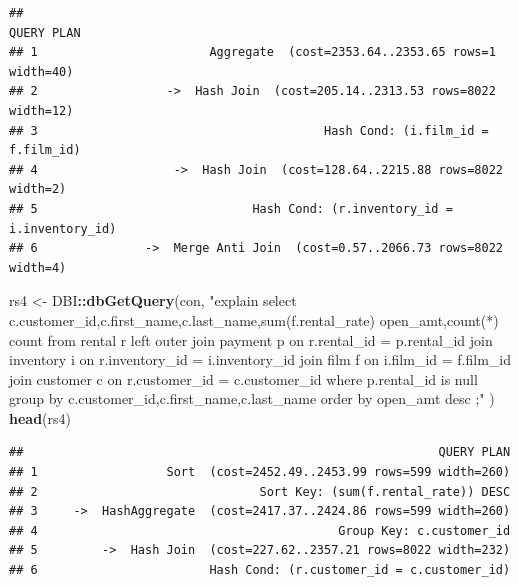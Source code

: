 \documentclass[]{book}
\newenvironment{Shaded}{\begin{snugshade}}{\end{snugshade}}
\newcommand{\KeywordTok}[1]{\textcolor[rgb]{0.13,0.29,0.53}{\textbf{#1}}}
\newcommand{\NormalTok}[1]{#1}
\newcommand{\OperatorTok}[1]{\textcolor[rgb]{0.81,0.36,0.00}{\textbf{#1}}}
\newcommand{\StringTok}[1]{\textcolor[rgb]{0.31,0.60,0.02}{#1}}
\theoremstyle{definition}
\theoremstyle{definition}
\theoremstyle{definition}
\theoremstyle{remark}
\begin{document}
\begin{verbatim}
##                                                                  QUERY PLAN
## 1                        Aggregate  (cost=2353.64..2353.65 rows=1 width=40)
## 2                  ->  Hash Join  (cost=205.14..2313.53 rows=8022 width=12)
## 3                                        Hash Cond: (i.film_id = f.film_id)
## 4                   ->  Hash Join  (cost=128.64..2215.88 rows=8022 width=2)
## 5                              Hash Cond: (r.inventory_id = i.inventory_id)
## 6               ->  Merge Anti Join  (cost=0.57..2066.73 rows=8022 width=4)
\end{verbatim}

\begin{Shaded}
\begin{Highlighting}[]
\NormalTok{rs4 <-}\StringTok{ }\NormalTok{DBI}\OperatorTok{::}\KeywordTok{dbGetQuery}\NormalTok{(con,}
                \StringTok{"explain select c.customer_id,c.first_name,c.last_name,sum(f.rental_rate) open_amt,count(*) count}
\StringTok{                   from rental r }
\StringTok{                        left outer join payment p }
\StringTok{                          on r.rental_id = p.rental_id  }
\StringTok{                        join inventory i}
\StringTok{                          on r.inventory_id = i.inventory_id}
\StringTok{                        join film f}
\StringTok{                          on i.film_id = f.film_id}
\StringTok{                        join customer c}
\StringTok{                          on r.customer_id = c.customer_id}
\StringTok{                  where p.rental_id is null}
\StringTok{                  group by c.customer_id,c.first_name,c.last_name}
\StringTok{                  order by open_amt desc}
\StringTok{                 ;"}
\NormalTok{                )  }
\KeywordTok{head}\NormalTok{(rs4)}
\end{Highlighting}
\end{Shaded}

\begin{verbatim}
##                                                          QUERY PLAN
## 1                  Sort  (cost=2452.49..2453.99 rows=599 width=260)
## 2                               Sort Key: (sum(f.rental_rate)) DESC
## 3     ->  HashAggregate  (cost=2417.37..2424.86 rows=599 width=260)
## 4                                          Group Key: c.customer_id
## 5         ->  Hash Join  (cost=227.62..2357.21 rows=8022 width=232)
## 6                        Hash Cond: (r.customer_id = c.customer_id)
\end{verbatim}
\end{document}
